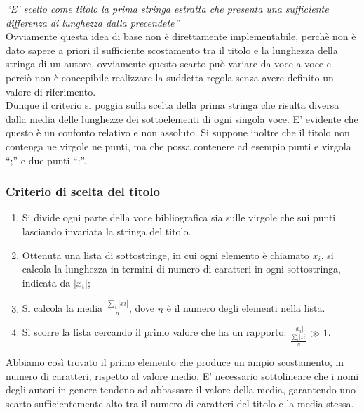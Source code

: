 \textit{``E' scelto come titolo la prima stringa estratta che presenta una sufficiente differenza di lunghezza dalla precendete''}\\

Ovviamente questa idea di base non è direttamente implementabile, perchè non è dato sapere a priori il sufficiente scostamento tra il titolo e la lunghezza della stringa di un autore, ovviamente questo scarto può variare da voce a voce e perciò non è concepibile realizzare la suddetta regola senza avere definito un valore di riferimento.\\
Dunque il criterio si poggia sulla scelta della prima stringa che risulta diversa dalla media delle lunghezze dei sottoelementi di ogni singola voce. E' evidente che questo è un confonto relativo e non assoluto. Si suppone inoltre che il titolo non contenga ne virgole ne punti, ma che possa contenere ad esempio punti e virgola ``;'' e due punti ``:''.
\\
\subsubsection{Criterio di scelta del titolo}
\begin{enumerate}
 \item Si divide ogni parte della voce bibliografica sia sulle virgole che sui punti lasciando invariata la stringa del titolo.
 \item Ottenuta una lista di sottostringe, in cui ogni elemento è chiamato $x_i$, si calcola la lunghezza in termini di numero di caratteri in ogni sottostringa, indicata da $|x_i|$;
 \item Si calcola la media $\frac{\sum_i |xi|}{n}$, dove $n$ è il numero degli elementi nella lista.
 \item Si scorre la lista cercando il primo valore che ha un rapporto: $ \frac{|x_i|}{\frac{\sum_i |xi|}{n} } \gg 1 $.
\end{enumerate}

Abbiamo così trovato il primo elemento che produce un ampio scostamento, in numero di caratteri, rispetto al valore medio. E' necessario sottolineare che i nomi degli autori in genere tendono ad abbassare il valore della media, garantendo uno scarto sufficientemente alto tra il numero di caratteri del titolo e la media stessa. 
\newpage

